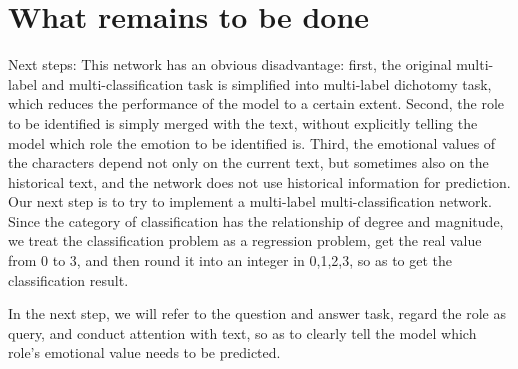 \documentclass[12pt,twocolumn,letterpaper]{article}
\begin{document}

\section{What remains to be done}

Next steps:  
This network has an obvious disadvantage: first, the original multi-label and multi-classification task is simplified into multi-label dichotomy task, which reduces the performance of the model to a certain extent.  Second, the role to be identified is simply merged with the text, without explicitly telling the model which role the emotion to be identified is.  Third, the emotional values of the characters depend not only on the current text, but sometimes also on the historical text, and the network does not use historical information for prediction.  
Our next step is to try to implement a multi-label multi-classification network.  Since the category of classification has the relationship of degree and magnitude, we treat the classification problem as a regression problem, get the real value from 0 to 3, and then round it into an integer in {0,1,2,3}, so as to get the classification result.  
 
In the next step, we will refer to the question and answer task, regard the role as query, and conduct attention with text, so as to clearly tell the model which role's emotional value needs to be predicted.  





   \makeatletter
    \renewcommand\@biblabel[1]{}
    \renewenvironment{thebibliography}[1]
    {\section*{\refname}%
    \@mkboth{\MakeUppercase\refname}{\MakeUppercase\refname}%
    \list{\@biblabel{\@arabic\c@enumiv}}%
    {\settowidth\labelwidth{\@biblabel{#1}}%
    \leftmargin\labelwidth
    \advance\leftmargin\labelsep
    \advance\leftmargin by 2em%
    \itemindent -2em%
    \@openbib@code
    \usecounter{enumiv}%
    \let\p@enumiv\@empty
    \renewcommand\theenumiv{\@arabic\c@enumiv}}%
    \sloppy
    \clubpenalty4000
    \@clubpenalty \clubpenalty
    \widowpenalty4000%
    \sfcode`\.\@m}
    {\def\@noitemerr
    {\@latex@warning{Empty `thebibliography' environment}}%
    \endlist}
    \makeatother
\end{document}
